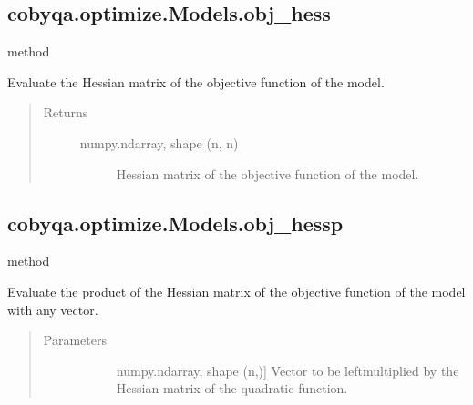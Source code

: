 \documentclass[letterpaper,10pt,english]{sphinxmanual}
\begin{document}
\begin{fulllineitems}
\subsection{cobyqa.optimize.Models.obj\_hess}
\label{\detokenize{refs/generated/cobyqa.optimize.Models.obj_hess:cobyqa-optimize-models-obj-hess}}\label{\detokenize{refs/generated/cobyqa.optimize.Models.obj_hess::doc}}
\sphinxAtStartPar
method

\begin{fulllineitems}
\label{\detokenize{refs/generated/cobyqa.optimize.Models.obj_hess:cobyqa.optimize.Models.obj_hess}}
\sphinxAtStartPar
Evaluate the Hessian matrix of the objective function of the model.
\begin{quote}\begin{description}
\item[{Returns}] \leavevmode\begin{description}
\item[{numpy.ndarray, shape (n, n)}] \leavevmode
\sphinxAtStartPar
Hessian matrix of the objective function of the model.

\end{description}

\end{description}\end{quote}

\end{fulllineitems}



\subsection{cobyqa.optimize.Models.obj\_hessp}
\label{\detokenize{refs/generated/cobyqa.optimize.Models.obj_hessp:cobyqa-optimize-models-obj-hessp}}\label{\detokenize{refs/generated/cobyqa.optimize.Models.obj_hessp::doc}}
\sphinxAtStartPar
method

\begin{fulllineitems}
\label{\detokenize{refs/generated/cobyqa.optimize.Models.obj_hessp:cobyqa.optimize.Models.obj_hessp}}
\sphinxAtStartPar
Evaluate the product of the Hessian matrix of the objective function of
the model with any vector.
\begin{quote}\begin{description}
\item[{Parameters}] \leavevmode\begin{description}
\item[{}] \leavevmode{[}numpy.ndarray, shape (n,){]}
\sphinxAtStartPar
Vector to be left\sphinxhyphen{}multiplied by the Hessian matrix of the quadratic
function.


\end{description}
\end{description}
\end{quote}
\end{fulllineitems}
\end{fulllineitems}
\end{document}
